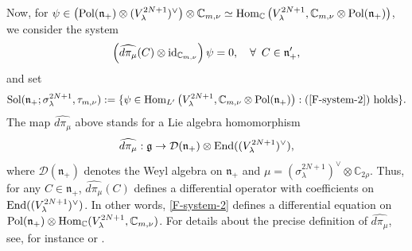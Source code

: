 \documentclass[12pt, pdflatex, a4paper]{article}
\theoremstyle{plain}
\theoremstyle{definition}
\def\C{{\mathbb C}}
\def\Weyl{\mathcal{D}}
\def\End{\text{\normalfont{End}}}
\def\g{\mathfrak{g}}
\def\Hom{\text{\normalfont{Hom}}}
\def\id{\text{\normalfont{id}}}
\def\n{\mathfrak{n}}
\def\Pol{\text{\normalfont{Pol}}}
\def\Sol{\text{\normalfont{Sol}}}
\begin{document}
Now, for $\psi \in \left(\Pol(\n_+)\otimes(V_\lambda^{2N+1})^\vee \right) \otimes \C_{m, \nu} \simeq \Hom_\C\left(V_\lambda^{2N+1}, \C_{m,\nu} \otimes \Pol(\n_+)\right)$, we consider the system
\begin{equation}\label{F-system-2}
\left(\widehat{d \pi_\mu}(C) \otimes \id_{\C_{m,\nu}} \right)\psi = 0, \quad \forall \enspace C\in \n_+^\prime,
\end{equation}
and set
\begin{equation*}
\Sol(\n_+; \sigma_\lambda^{2N+1}, \tau_{m, \nu}) := \{\psi \in \Hom_{L^\prime}\left(V_\lambda^{2N+1}, \C_{m,\nu} \otimes \Pol(\n_+)\right) :\text{\normalfont{(\ref{F-system-2}) holds}}\}.
\end{equation*}
The map $\widehat{d\pi_\mu}$ above stands for a Lie algebra homomorphism
\begin{equation*}
\widehat{d \pi_\mu}: \g \rightarrow \Weyl(\n_+)\otimes \End((V^{2N+1}_\lambda)^\vee),
\end{equation*} 
where $\Weyl(\n_+)$ denotes the Weyl algebra on $\n_+$ and $\mu = (\sigma_\lambda^{2N+1})^\vee \otimes \C_{2\rho}$. Thus, for any $C \in \n_+$, $\widehat{d\pi_\mu}(C)$ defines a differential operator with coefficients on $\End((V^{2N+1}_\lambda)^\vee)$. In other words, \eqref{F-system-2} defines a differential equation on $\Pol(\n_+) \otimes \Hom_\C(V^{2N+1}_\lambda, \C_{m, \nu})$. For details about the precise definition of $\widehat{d \pi_\mu}$, see, for instance \cite[Sec. 3]{KP16a} or \cite[Sec. 2]{KO25}.
\end{document}
